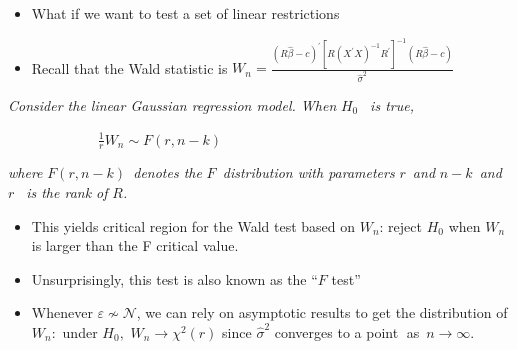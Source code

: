 \documentclass[notes=show]{beamer}
\begin{document}
\begin{frame}%


\begin{itemize}
\item What if we want to test a set of linear restrictions

\item Recall that the Wald statistic is $W_{n}=\frac{\left( R\hat{\beta}%
-c\right) ^{\prime }\left[ R\left( X^{\prime }X\right) ^{-1}R^{\prime }%
\right] ^{-1}\left( R\hat{\beta}-c\right) }{\widehat{\sigma }^{2}}$
\end{itemize}

\begin{theorem}
\textit{Consider the linear Gaussian regression model. When }$H_{0}$\textit{%
\ is true,}

$\ \ \ \ \ \ \ \ \ \ \ \ \ \ \ \ \ \ \ \ \ \ \ \ \ \ \ \ \ \frac{1}{r}%
W_{n}\sim F\left( r,n-k\right) $

\textit{where }$F\left( r,n-k\right) $\textit{\ denotes the }$F$\textit{\
distribution with parameters }$r$\textit{\ and }$n-k$\textit{\ and }$r$%
\textit{\ is the rank of }$R$\textit{.}
\end{theorem}

\begin{itemize}
\item This yields critical region for the Wald test based on $W_{n}$: reject 
$H_{0}$ when $W_{n}$ is larger than the F critical value.

\item Unsurprisingly, this test is also known as the \textquotedblleft $F$
test\textquotedblright

\item Whenever $\varepsilon \nsim \mathcal{N}$, we can rely on asymptotic
results to get the distribution of $W_{n}:$ under $H_{0},$ $W_{n}\rightarrow
\chi ^{2}\left( r\right) $ since $\widehat{\sigma }^{2}$ converges to a point%
$\;$as\ $n\rightarrow \infty .$
\end{itemize}

\end{frame}%
\end{document}
